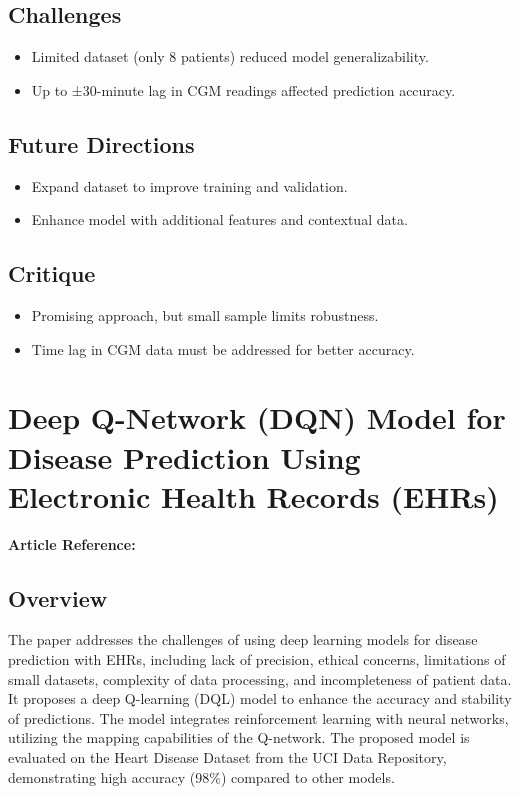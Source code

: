 \subsection*{Challenges}
\begin{itemize}
    \item Limited dataset (only 8 patients) reduced model generalizability.
    \item Up to ±30-minute lag in CGM readings affected prediction accuracy.
\end{itemize}

\subsection*{Future Directions}
\begin{itemize}
    \item Expand dataset to improve training and validation.
    \item Enhance model with additional features and contextual data.
\end{itemize}

\subsection*{Critique}
\begin{itemize}
    \item Promising approach, but small sample limits robustness.
    \item Time lag in CGM data must be addressed for better accuracy.
\end{itemize}

\section{Deep Q-Network (DQN) Model for Disease Prediction Using Electronic Health Records (EHRs)}
\textbf{Article Reference:} \cite{article_10}

\subsection*{Overview}
The paper addresses the challenges of using deep learning models for disease prediction with EHRs, including lack of precision, ethical concerns, limitations of small datasets, complexity of data processing, and incompleteness of patient data. It proposes a deep Q-learning (DQL) model to enhance the accuracy and stability of predictions. The model integrates reinforcement learning with neural networks, utilizing the mapping capabilities of the Q-network. The proposed model is evaluated on the Heart Disease Dataset from the UCI Data Repository, demonstrating high accuracy (98\%) compared to other models.

